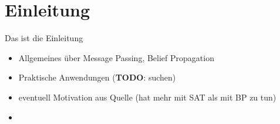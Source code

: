 \chapter{Einleitung}

Das ist die Einleitung

\begin{itemize}
	\item Allgemeines über Message Passing, Belief Propagation
	\item Praktische Anwendungen (\textbf{TODO}: suchen)
	\item eventuell Motivation aus Quelle (hat mehr mit SAT als mit BP zu tun)
	\item 
\end{itemize}
